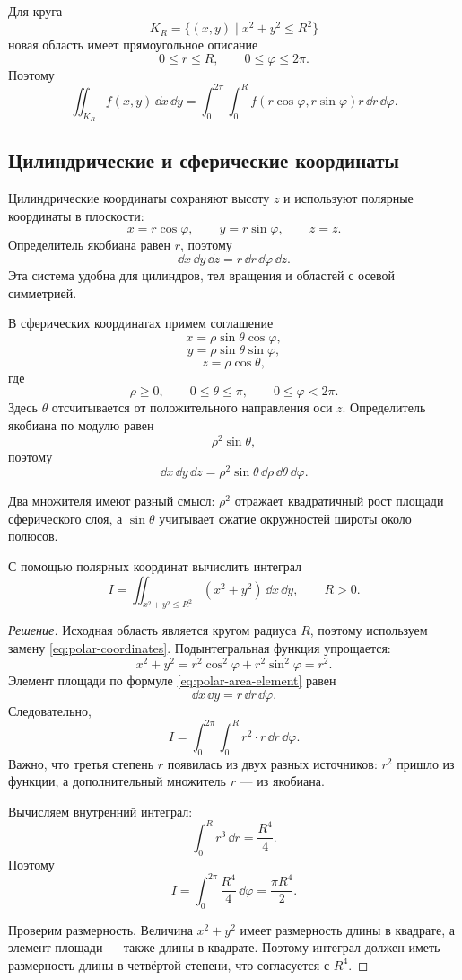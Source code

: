 \begin{example}
Для круга
\[
K_R=
\{(x,y)\mid x^2+y^2\leq R^2\}
\]
новая область имеет прямоугольное описание
\[
0\leq r\leq R,
\qquad
0\leq\varphi\leq2\pi.
\]
Поэтому
\[
\iint_{K_R}f(x,y)\,\dd x\,\dd y
=
\int_0^{2\pi}\int_0^R
f(r\cos\varphi,r\sin\varphi)
 r\,\dd r\,\dd\varphi.
\]
\end{example}

\subsection{Цилиндрические и сферические координаты}

Цилиндрические координаты сохраняют высоту $z$ и используют полярные координаты в плоскости:
\[
x=r\cos\varphi,
\qquad
y=r\sin\varphi,
\qquad z=z.
\]
Определитель якобиана равен $r$, поэтому
\[
\dd x\,\dd y\,\dd z
=
r\,\dd r\,\dd\varphi\,\dd z.
\]
Эта система удобна для цилиндров, тел вращения и областей с осевой симметрией.

В сферических координатах примем соглашение
\[
x=\rho\sin\theta\cos\varphi,
\]
\[
y=\rho\sin\theta\sin\varphi,
\]
\[
z=\rho\cos\theta,
\]
где
\[
\rho\geq0,
\qquad
0\leq\theta\leq\pi,
\qquad
0\leq\varphi<2\pi.
\]
Здесь $\theta$ отсчитывается от положительного направления оси $z$. Определитель якобиана по модулю равен
\[
\rho^2\sin\theta,
\]
поэтому
\begin{equation}
\label{eq:spherical-volume-element}
\dd x\,\dd y\,\dd z
=
\rho^2\sin\theta
\,\dd\rho\,\dd\theta\,\dd\varphi.
\end{equation}

Два множителя имеют разный смысл: $\rho^2$ отражает квадратичный рост площади сферического слоя, а $\sin\theta$ учитывает сжатие окружностей широты около полюсов.

\begin{problem}
С помощью полярных координат вычислить интеграл
\[
I
=
\iint_{x^2+y^2\leq R^2}
(x^2+y^2)\,\dd x\,\dd y,
\qquad R>0.
\]
\end{problem}

\begin{proof}[Решение]
Исходная область является кругом радиуса $R$, поэтому используем замену \eqref{eq:polar-coordinates}. Подынтегральная функция упрощается:
\[
x^2+y^2
=
r^2\cos^2\varphi+r^2\sin^2\varphi
=r^2.
\]
Элемент площади по формуле \eqref{eq:polar-area-element} равен
\[
\dd x\,\dd y=r\,\dd r\,\dd\varphi.
\]
Следовательно,
\[
I
=
\int_0^{2\pi}\int_0^R
r^2\cdot r\,\dd r\,\dd\varphi.
\]
Важно, что третья степень $r$ появилась из двух разных источников: $r^2$ пришло из функции, а дополнительный множитель $r$ --- из якобиана.

Вычисляем внутренний интеграл:
\[
\int_0^Rr^3\,\dd r
=
\frac{R^4}{4}.
\]
Поэтому
\[
I
=
\int_0^{2\pi}\frac{R^4}{4}\,\dd\varphi
=
\frac{\pi R^4}{2}.
\]

Проверим размерность. Величина $x^2+y^2$ имеет размерность длины в квадрате, а элемент площади --- также длины в квадрате. Поэтому интеграл должен иметь размерность длины в четвёртой степени, что согласуется с $R^4$.
\end{proof}

